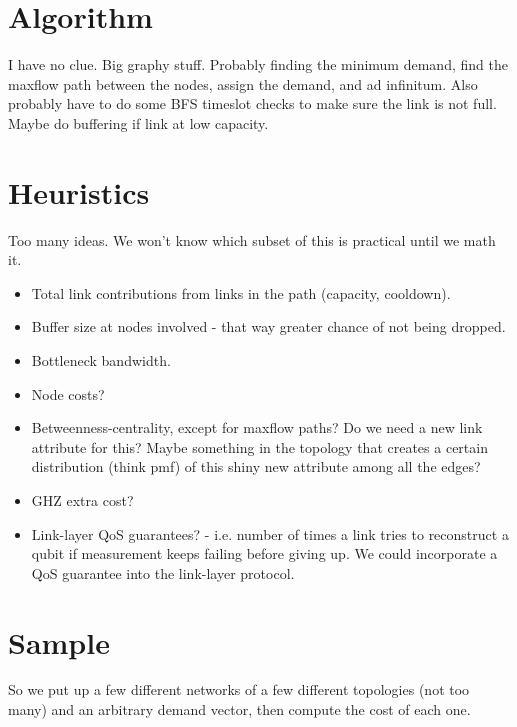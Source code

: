 \documentclass{amsart}
\begin{document}
    \section{Algorithm}

    I have no clue. Big graphy stuff. Probably finding the minimum demand, find the maxflow path between the nodes, assign the demand, and ad infinitum. Also probably have to do some BFS timeslot checks to make sure the link is not full. Maybe do buffering if link at low capacity.

    \label{TODO:algorithm}

    \section{Heuristics}

    Too many ideas. We won't know which subset of this is practical until we math it.
    \begin{itemize}
        \item Total link contributions from links in the path (capacity, cooldown).
        \item Buffer size at nodes involved - that way greater chance of not being dropped.
        \item Bottleneck bandwidth.
        \item Node costs? 
        \item Betweenness-centrality, except for maxflow paths? Do we need a new link attribute for this? Maybe something in the topology that creates a certain distribution (think pmf) of this shiny new attribute among all the edges?
        \item GHZ extra cost?
        \item Link-layer QoS guarantees? - i.e. number of times a link tries to reconstruct a qubit if measurement keeps failing before giving up. We could incorporate a QoS guarantee into the link-layer protocol.
    \end{itemize}

    \section{Sample}

    So we put up a few different networks of a few different topologies (not too many) and an arbitrary demand vector, then compute the cost of each one. 
\end{document}
